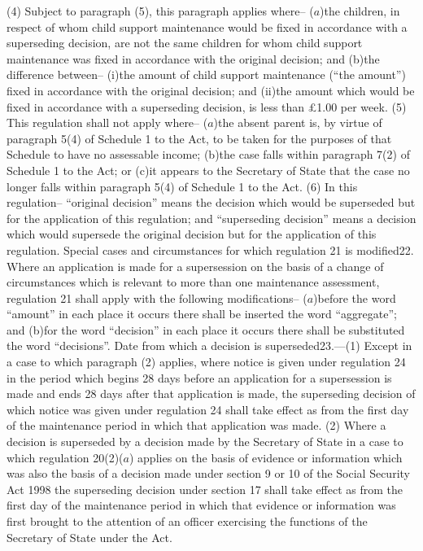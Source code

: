 \documentclass[12pt,a4paper]{article}
\begin{document}
(4) Subject to paragraph (5), this paragraph applies where–
($a$)the children, in respect of whom child support maintenance would be fixed in accordance with a superseding decision, are not the same children for whom child support maintenance was fixed in accordance with the original decision; and
(b)the difference between–
(i)the amount of child support maintenance (“the amount”) fixed in accordance with the original decision; and
(ii)the amount which would be fixed in accordance with a superseding decision, is less than £1.00 per week.
(5) This regulation shall not apply where–
($a$)the absent parent is, by virtue of paragraph 5(4) of Schedule 1 to the Act, to be taken for the purposes of that Schedule to have no assessable income;
(b)the case falls within paragraph 7(2) of Schedule 1 to the Act; or
(c)it appears to the Secretary of State that the case no longer falls within paragraph 5(4) of Schedule 1 to the Act.
(6) In this regulation–
“original decision” means the decision which would be superseded but for the application of this regulation; and
“superseding decision” means a decision which would supersede the original decision but for the application of this regulation.
Special cases and circumstances for which regulation 21 is modified22.  Where an application is made for a supersession on the basis of a change of circumstances which is relevant to more than one maintenance assessment, regulation 21 shall apply with the following modifications–
($a$)before the word “amount” in each place it occurs there shall be inserted the word “aggregate”; and
(b)for the word “decision” in each place it occurs there shall be substituted the word “decisions”.
Date from which a decision is superseded23.—(1) Except in a case to which paragraph (2) applies, where notice is given under regulation 24 in the period which begins 28 days before an application for a supersession is made and ends 28 days after that application is made, the superseding decision of which notice was given under regulation 24 shall take effect as from the first day of the maintenance period in which that application was made.
(2) Where a decision is superseded by a decision made by the Secretary of State in a case to which regulation 20(2)($a$) applies on the basis of evidence or information which was also the basis of a decision made under section 9 or 10 of the Social Security Act 1998 the superseding decision under section 17 shall take effect as from the first day of the maintenance period in which that evidence or information was first brought to the attention of an officer exercising the functions of the Secretary of State under the Act.
\end{document}
